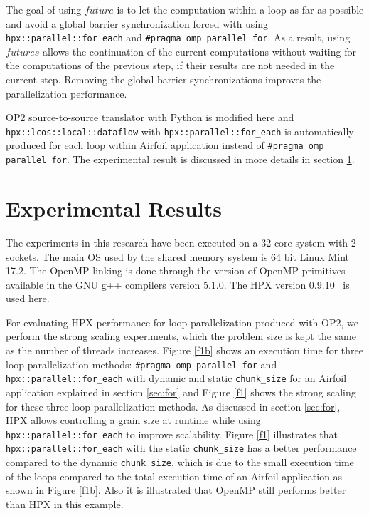 \documentclass[conference]{IEEEtran}
\begin{document}
The goal of using $future$ is to let the computation within a loop as far as possible and avoid a global barrier synchronization forced with using  \texttt{hpx::parallel::for\_each} and \texttt{\#pragma omp parallel for}. As a result, using $futures$ allows the continuation of the current computations without waiting for the computations of the previous step, if their results are not needed in the current step. Removing the global barrier synchronizations improves the parallelization performance. 

OP2 source-to-source translator with Python is modified here and \texttt{hpx::lcos::local::dataflow} with  \texttt{hpx::parallel::for\_each} is automatically produced for each loop within Airfoil application instead of \texttt{\#pragma omp parallel for}. The experimental result is discussed in more details in section \ref{sec:res}.



\section{Experimental Results}
\label{sec:res}



The experiments in this research have been executed on a 32 core system with 2 sockets. The main OS used by the shared memory system is 64 bit Linux Mint 17.2. The OpenMP linking is done through the version of OpenMP primitives available in the GNU g++ compilers version 5.1.0. The HPX version 0.9.10~\cite{hpx_v0.9.11} is used here.
 
 

For evaluating HPX performance for loop parallelization produced with OP2, we perform the strong scaling experiments, which the problem size is kept the same as the number of threads increases. Figure \ref{f1b} shows an execution time for three loop parallelization methods: \texttt{\#pragma omp parallel for} and \texttt{hpx::parallel::for\_each} with dynamic and static \texttt{chunk\_size} for an Airfoil application explained in section \ref{sec:for} and Figure \ref{f1} shows the strong scaling for these three loop parallelization methods. As discussed in section \ref{sec:for}, HPX allows controlling a grain size at runtime while using \texttt{hpx::parallel::for\_each} to improve scalability. Figure \ref{f1} illustrates that \texttt{hpx::parallel::for\_each} with the static \texttt{chunk\_size} has a better performance compared to the dynamic \texttt{chunk\_size}, which is due to the small execution time of the loops compared to the total execution time of an Airfoil application as shown in Figure \ref{f1b}. Also it is illustrated that OpenMP still performs better than HPX in this example.
\end{document}
